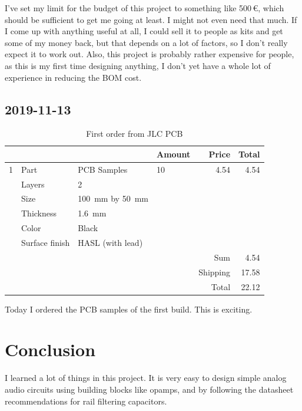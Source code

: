 \documentclass[a4paper]{article}
\begin{document}
I've set my limit for the budget of this project to something like 500\,€, which should be sufficient to get me going at least. I might not even need that much. If I come up with anything useful at all, I could sell it to people as kits and get some of my money back, but that depends on a lot of factors, so I don't really expect it to work out. Also, this project is probably rather expensive for people, as this is my first time designing anything, I don't yet have a whole lot of experience in reducing the BOM cost.

\subsection{2019-11-13}

\begin{table}[h!]
\centering
\caption{First order from JLC PCB}\label{tbl:order-2019-11-09}
\newcommand{\partline}[7]{
#1&Part&#2&#3&#4&#5\\
&Manufacturer Part&#6\\
&Description&#7\\}
\footnotesize
\begin{tabular}{@{}llp{5cm}lrr@{}}
\toprule
&&&Amount&Price&Total\\
\midrule
1 & Part & PCB Samples & 10 & 4.54 & 4.54\\
& Layers & 2\\
& Size & \SI{100}{\milli\meter} by \SI{50}{\milli\meter}\\
& Thickness & \SI{1.6}{\milli\meter}\\
& Color & Black\\
& Surface finish & HASL (with lead)\\
\midrule
&&&&Sum&4.54\\
&&&&Shipping&17.58\\
&&&&Total&22.12\\
\bottomrule
\end{tabular}
\end{table}

Today I ordered the PCB samples of the first build. This is exciting.

\section{Conclusion}

I learned a lot of things in this project. It is very easy to design simple analog audio circuits using building blocks like opamps, and by following the datasheet recommendations for rail filtering capacitors. 
\end{document}
